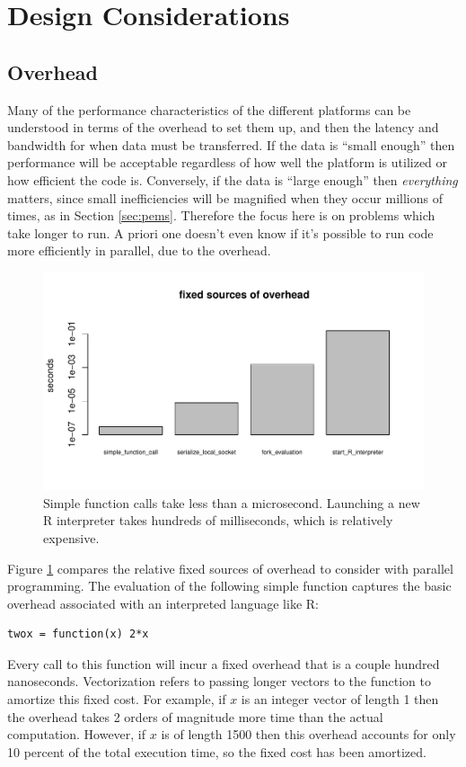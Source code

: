\documentclass[12pt]{article}
\begin{document}
\section{Design Considerations}

\subsection{Overhead}

Many of the performance characteristics of the different platforms can be
understood in terms of the overhead to set them up, and then the latency
and bandwidth for when data must be transferred.  If the data is ``small
enough'' then performance will be acceptable regardless of how well the
platform is utilized or how efficient the code is. Conversely, if the data
is ``large enough'' then \emph{everything} matters, since small
inefficiencies will be magnified when they occur millions of times, as in
Section \ref{sec:pems}.  Therefore the focus here is on problems which take longer
to run. A priori one doesn't even know if it's possible to run code more
efficiently in parallel, due to the overhead.

\begin{figure}
\centering
\includegraphics[width=.8\linewidth]{compute_times/overhead}
\caption{Simple function calls take less than a microsecond. Launching a
    new R interpreter takes hundreds of milliseconds, which is relatively expensive.}
\label{fig:overhead}
\end{figure}

Figure \ref{fig:overhead} compares the relative fixed sources of overhead to
consider with parallel programming. The evaluation of the following simple
function captures the basic overhead associated with an interpreted
language like R:
\begin{verbatim}
twox = function(x) 2*x
\end{verbatim}
Every call to this function will incur a fixed overhead that is a couple
hundred nanoseconds. Vectorization refers to passing longer vectors to the
function to amortize this fixed cost. For example, if $x$ is an integer
vector of length 1 then the overhead takes 2 orders of magnitude more time
than the actual computation. However, if $x$ is of length 1500 then this
overhead accounts for only 10 percent of the total execution time, so the
fixed cost has been amortized.
\end{document}
